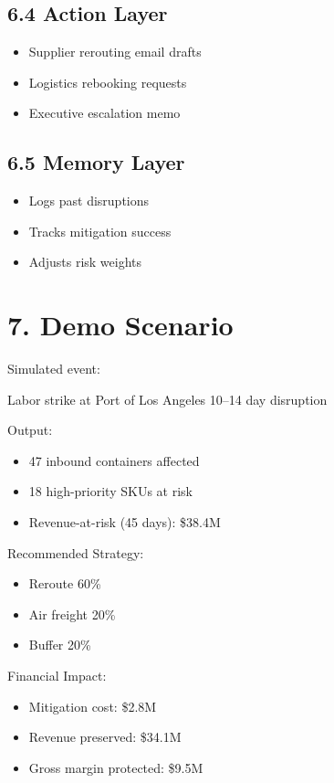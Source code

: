 \documentclass[11pt]{article}
\begin{document}
\subsection*{6.4 Action Layer}
\begin{itemize}
    \item Supplier rerouting email drafts
    \item Logistics rebooking requests
    \item Executive escalation memo
\end{itemize}

\subsection*{6.5 Memory Layer}
\begin{itemize}
    \item Logs past disruptions
    \item Tracks mitigation success
    \item Adjusts risk weights
\end{itemize}

\section*{7. Demo Scenario}

Simulated event:

Labor strike at Port of Los Angeles  
10--14 day disruption  

Output:

\begin{itemize}
    \item 47 inbound containers affected
    \item 18 high-priority SKUs at risk
    \item Revenue-at-risk (45 days): \$38.4M
\end{itemize}

Recommended Strategy:

\begin{itemize}
    \item Reroute 60\%
    \item Air freight 20\%
    \item Buffer 20\%
\end{itemize}

Financial Impact:

\begin{itemize}
    \item Mitigation cost: \$2.8M
    \item Revenue preserved: \$34.1M
    \item Gross margin protected: \$9.5M
\end{itemize}
\end{document}
